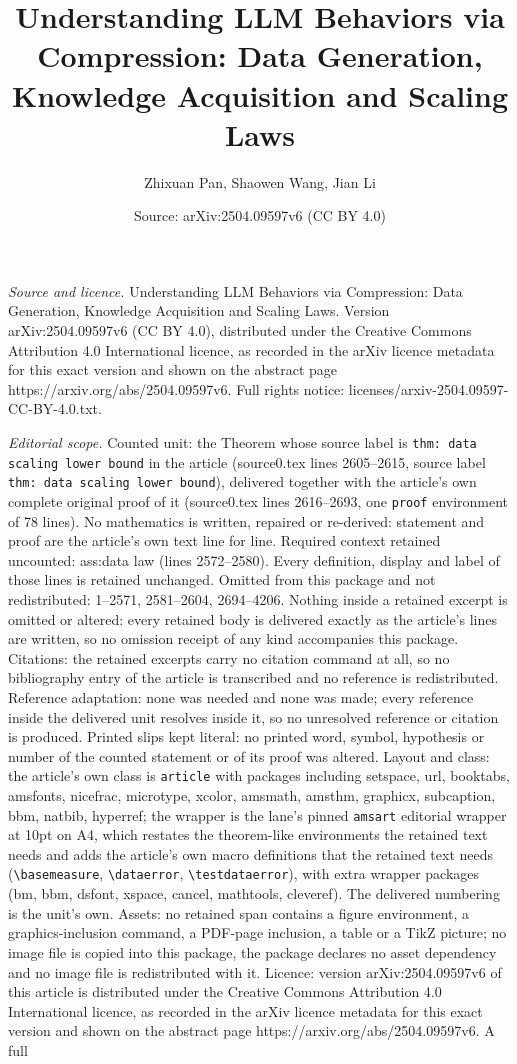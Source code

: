 \documentclass[10pt,a4paper]{amsart}
\title[Understanding LLM Behaviors via Compression: Data Generation]{Understanding LLM Behaviors via Compression: Data Generation, Knowledge Acquisition and Scaling Laws}
\author{Zhixuan Pan, Shaowen Wang, Jian Li}
\date{Source: arXiv:2504.09597v6 (CC BY 4.0)}
\begin{document}
\maketitle

\noindent\emph{Source and licence.} Understanding LLM Behaviors via Compression: Data Generation, Knowledge Acquisition and Scaling Laws. Version arXiv:2504.09597v6 (CC BY 4.0), distributed under the Creative Commons Attribution 4.0 International licence, as recorded in the arXiv licence metadata for this exact version and shown on the abstract page https://arxiv.org/abs/2504.09597v6. Full rights notice: licenses/arxiv-2504.09597-CC-BY-4.0.txt.\par\smallskip

\noindent\textit{Editorial scope.} Counted unit: the Theorem whose source label is \texttt{thm: data scaling lower bound} in the article (source0.tex lines 2605--2615, source label \texttt{thm: data scaling lower bound}), delivered together with the article's own complete original proof of it (source0.tex lines 2616--2693, one \texttt{proof} environment of 78 lines). No mathematics is written, repaired or re-derived: statement and proof are the article's own text line for line. Required context retained uncounted: ass:data law (lines 2572--2580). Every definition, display and label of those lines is retained unchanged. Omitted from this package and not redistributed: 1--2571, 2581--2604, 2694--4206. Nothing inside a retained excerpt is omitted or altered: every retained body is delivered exactly as the article's lines are written, so no omission receipt of any kind accompanies this package. Citations: the retained excerpts carry no citation command at all, so no bibliography entry of the article is transcribed and no reference is redistributed. Reference adaptation: none was needed and none was made; every reference inside the delivered unit resolves inside it, so no unresolved reference or citation is produced. Printed slips kept literal: no printed word, symbol, hypothesis or number of the counted statement or of its proof was altered. Layout and class: the article's own class is \texttt{article} with packages including setspace, url, booktabs, amsfonts, nicefrac, microtype, xcolor, amsmath, amsthm, graphicx, subcaption, bbm, natbib, hyperref; the wrapper is the lane's pinned \texttt{amsart} editorial wrapper at 10pt on A4, which restates the theorem-like environments the retained text needs and adds the article's own macro definitions that the retained text needs (\texttt{\textbackslash basemeasure}, \texttt{\textbackslash dataerror}, \texttt{\textbackslash testdataerror}), with extra wrapper packages (bm, bbm, dsfont, xspace, cancel, mathtools, cleveref). The delivered numbering is the unit's own. Assets: no retained span contains a figure environment, a graphics-inclusion command, a PDF-page inclusion, a table or a TikZ picture; no image file is copied into this package, the package declares no asset dependency and no image file is redistributed with it. Licence: version arXiv:2504.09597v6 of this article is distributed under the Creative Commons Attribution 4.0 International licence, as recorded in the arXiv licence metadata for this exact version and shown on the abstract page https://arxiv.org/abs/2504.09597v6. A full 
\end{document}

